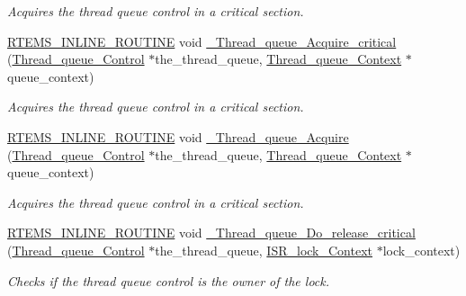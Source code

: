 \begin{DoxyCompactItemize}
\begin{DoxyCompactList}\small\item\em Acquires the thread queue control in a critical section. \end{DoxyCompactList}\item 
\mbox{\hyperlink{group__RTEMSScoreBaseDefs_gac216239df231d5dbd15e3520b0b9313f}{R\+T\+E\+M\+S\+\_\+\+I\+N\+L\+I\+N\+E\+\_\+\+R\+O\+U\+T\+I\+NE}} void \mbox{\hyperlink{group__RTEMSScoreThreadQueue_ga2bb5c604a28a636950cca7aa43a47869}{\+\_\+\+Thread\+\_\+queue\+\_\+\+Acquire\+\_\+critical}} (\mbox{\hyperlink{structThread__queue__Control}{Thread\+\_\+queue\+\_\+\+Control}} $\ast$the\+\_\+thread\+\_\+queue, \mbox{\hyperlink{structThread__queue__Context}{Thread\+\_\+queue\+\_\+\+Context}} $\ast$queue\+\_\+context)
\begin{DoxyCompactList}\small\item\em Acquires the thread queue control in a critical section. \end{DoxyCompactList}\item 
\mbox{\hyperlink{group__RTEMSScoreBaseDefs_gac216239df231d5dbd15e3520b0b9313f}{R\+T\+E\+M\+S\+\_\+\+I\+N\+L\+I\+N\+E\+\_\+\+R\+O\+U\+T\+I\+NE}} void \mbox{\hyperlink{group__RTEMSScoreThreadQueue_ga40080175681761a842fe6ab4784735b9}{\+\_\+\+Thread\+\_\+queue\+\_\+\+Acquire}} (\mbox{\hyperlink{structThread__queue__Control}{Thread\+\_\+queue\+\_\+\+Control}} $\ast$the\+\_\+thread\+\_\+queue, \mbox{\hyperlink{structThread__queue__Context}{Thread\+\_\+queue\+\_\+\+Context}} $\ast$queue\+\_\+context)
\begin{DoxyCompactList}\small\item\em Acquires the thread queue control in a critical section. \end{DoxyCompactList}\item 
\mbox{\hyperlink{group__RTEMSScoreBaseDefs_gac216239df231d5dbd15e3520b0b9313f}{R\+T\+E\+M\+S\+\_\+\+I\+N\+L\+I\+N\+E\+\_\+\+R\+O\+U\+T\+I\+NE}} void \mbox{\hyperlink{group__RTEMSScoreThreadQueue_ga923d39f206f389ae8a8293e22bae8fbf}{\+\_\+\+Thread\+\_\+queue\+\_\+\+Do\+\_\+release\+\_\+critical}} (\mbox{\hyperlink{structThread__queue__Control}{Thread\+\_\+queue\+\_\+\+Control}} $\ast$the\+\_\+thread\+\_\+queue, \mbox{\hyperlink{structISR__lock__Context}{I\+S\+R\+\_\+lock\+\_\+\+Context}} $\ast$lock\+\_\+context)
\begin{DoxyCompactList}\small\item\em Checks if the thread queue control is the owner of the lock. \end{DoxyCompactList}\item 

\end{DoxyCompactItemize}
